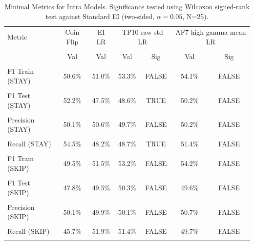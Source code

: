 \begin{table}[H]
\centering
\begin{tabular}{lcccccc}
\hline
Metric & Coin Flip & EI LR & \multicolumn{2}{c}{TP10 raw std LR} & \multicolumn{2}{c}{AF7 high gamma mean LR} \\\\
 & Val & Val & Val & Sig & Val & Sig \\\\
\hline
F1 Train (STAY) & 50.6\% & 51.0\% & 53.3\% & FALSE & 54.1\% & FALSE \\\\
F1 Test (STAY) & 52.2\% & 47.5\% & 48.6\% & TRUE & 50.2\% & FALSE \\\\
Precision (STAY) & 50.1\% & 50.6\% & 49.7\% & FALSE & 50.2\% & FALSE \\\\
Recall (STAY) & 54.5\% & 48.2\% & 48.7\% & TRUE & 51.4\% & FALSE \\\\
F1 Train (SKIP) & 49.5\% & 51.5\% & 53.2\% & FALSE & 54.2\% & FALSE \\\\
F1 Test (SKIP) & 47.8\% & 49.5\% & 50.3\% & FALSE & 49.6\% & FALSE \\\\
Precision (SKIP) & 50.1\% & 49.9\% & 50.1\% & FALSE & 50.7\% & FALSE \\\\
Recall (SKIP) & 45.7\% & 51.9\% & 51.4\% & FALSE & 49.7\% & FALSE \\\\
\hline
\end{tabular}
\caption{Minimal Metrics for Intra Models. Significance tested using Wilcoxon signed-rank test against Standard EI (two-sided, $\alpha=0.05$, N=25).}
\label{tab:metrics_intra_ablation}
\end{table}